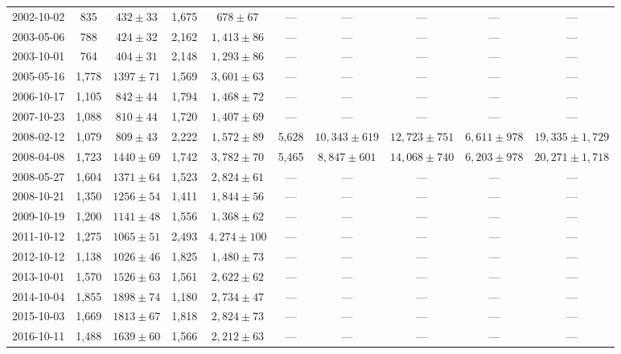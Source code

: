 \begin{landscape}
\begin{longtable}{cccccccccc}
{2002-10-02} & 835 & {$432  \pm  33$} & 1,675 & {$678 \pm 67$} & --- & --- & --- & --- & --- \\
{2003-05-06} & 788 & {$424  \pm  32$} & 2,162 & {$1,413 \pm 86$} & --- & --- & --- & --- & --- \\
{2003-10-01} & 764 & {$404  \pm  31$} & 2,148 & {$1,293 \pm 86$} & --- & --- & --- & --- & --- \\
{2005-05-16} & 1,778 & {$1397  \pm  71$} & 1,569 & {$3,601 \pm 63$} & --- & --- & --- & --- & --- \\
{2006-10-17} & 1,105 & {$842  \pm  44$} & 1,794 & {$1,468 \pm 72$} & --- & --- & --- & --- & --- \\
{2007-10-23} & 1,088 & {$810  \pm  44$} & 1,720 & {$1,407 \pm 69$} & --- & --- & --- & --- & --- \\
{2008-02-12} & 1,079 & {$809  \pm  43$} & 2,222 & {$1,572 \pm 89$} & 5,628 & {$10,343 \pm 619$} & {$12,723 \pm 751$} & {$6,611 \pm 978$} & {$19,335 \pm 1,729$} \\
{2008-04-08} & 1,723 & {$1440  \pm  69$} & 1,742 & {$3,782 \pm 70$} & 5,465 & {$8,847 \pm 601$} & {$14,068 \pm 740$} & {$6,203 \pm 978$} & {$20,271 \pm 1,718$} \\
{2008-05-27} & 1,604 & {$1371  \pm  64$} & 1,523 & {$2,824 \pm 61$} & --- & --- & --- & --- & --- \\
{2008-10-21} & 1,350 & {$1256  \pm  54$} & 1,411 & {$1,844 \pm 56$} & --- & --- & --- & --- & --- \\
{2009-10-19} & 1,200 & {$1141  \pm  48$} & 1,556 & {$1,368 \pm 62$} & --- & --- & --- & --- & --- \\
{2011-10-12} & 1,275 & {$1065  \pm  51$} & 2,493 & {$4,274 \pm 100$} & --- & --- & --- & --- & --- \\
{2012-10-12} & 1,138 & {$1026  \pm  46$} & 1,825 & {$1,480 \pm 73$} & --- & --- & --- & --- & --- \\
{2013-10-01} & 1,570 & {$1526  \pm  63$} & 1,561 & {$2,622 \pm 62$} & --- & --- & --- & --- & --- \\
{2014-10-04} & 1,855 & {$1898  \pm  74$} & 1,180 & {$2,734 \pm 47$} & --- & --- & --- & --- & --- \\
{2015-10-03} & 1,669 & {$1813  \pm  67$} & 1,818 & {$2,824 \pm 73$} & --- & --- & --- & --- & --- \\
{2016-10-11} & 1,488 & {$1639  \pm  60$} & 1,566 & {$2,212 \pm 63$} & --- & --- & --- & --- & --- \\
\end{longtable} 
\end{landscape} 
